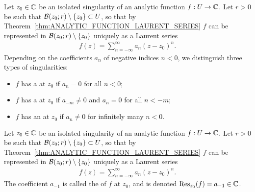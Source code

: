 \begin{definition}
  \label{def:singularity_classification}
  Let $z_0 \in \bC$ be an isolated singularity of
  an analytic function $f : U \to \bC$.
  Let $r > 0$ be such that $\BallRC{r}{z_0} \setminus \set{z_0} \subset U$,
  so that by Theorem~\ref{thm:ANALYTIC_FUNCTION_LAURENT_SERIES}
  $f$ can be represented in $\BallRC{r}{z_0} \setminus \set{z_0}$
  uniquely as a Laurent series
  \begin{align*}
    f(z) = \sum_{n=-\infty}^\infty a_n (z - z_0)^n .
  \end{align*}
  Depending on the coefficients $a_n$ of negative indices $n < 0$,
  we distinguish three types of singularities:
  \begin{itemize}
    \item $f$ has a  at $z_0$ if $a_n = 0$ for all $n < 0$;
    \item $f$ has a  at $z_0$
      if $a_{-m} \ne 0$ and $a_n = 0$ for all $n < -m$;
    \item $f$ has an  at $z_0$ if
      $a_n \ne 0$ for infinitely many $n < 0$.
  \end{itemize}
\end{definition}

\begin{definition}
  \label{def:residue}
  Let $z_0 \in \bC$ be an isolated singularity of
  an analytic function $f : U \to \bC$.
  Let $r > 0$ be such that $\BallRC{r}{z_0} \setminus \set{z_0} \subset U$,
  so that by Theorem~\ref{thm:ANALYTIC_FUNCTION_LAURENT_SERIES}
  $f$ can be represented in $\BallRC{r}{z_0} \setminus \set{z_0}$
  uniquely as a Laurent series
  \begin{align*}
    f(z) = \sum_{n=-\infty}^\infty a_n (z - z_0)^n .
  \end{align*}
  The coefficient $a_{-1}$ is called the  of $f$ at $z_0$,
  and is denoted $\ResAtOf{z_0}{f} = a_{-1} \in \bC$.
\end{definition}

